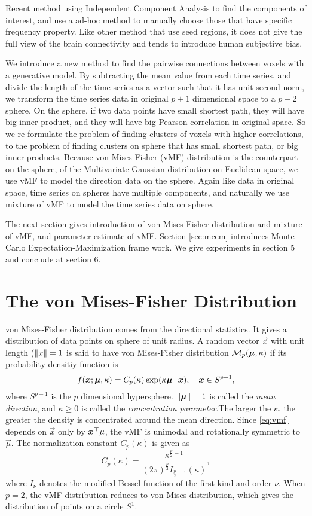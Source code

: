 \documentclass[runningheads,a4paper]{llncs}
\begin{document}
Recent method using Independent Component Analysis to find the
components of interest, and use a ad-hoc method to manually choose
those that have specific frequency property. Like other method that
use seed regions, it does not give the full view of the brain
connectivity and tends to introduce human subjective bias.

We introduce a new method to find the pairwise connections between
voxels with a generative model. By subtracting the mean value from
each time series, and divide the length of the time series as a vector
such that it has unit second norm, we transform the time series data
in original $p+1$ dimensional space to a $p-2$ sphere. On the sphere,
if two data points have small shortest path, they will have big inner
product, and they will have big Pearson correlation in original
space. So we re-formulate the problem of finding clusters of voxels
with higher correlations, to the problem of finding clusters on sphere
that has small shortest path, or big inner products. Because von
Mises-Fisher (vMF) distribution is the counterpart on the sphere, of
the Multivariate Gaussian distribution on Euclidean space, we use vMF
to model the direction data on the sphere. Again like data in original
space, time series on spheres have multiple components, and naturally
we use mixture of vMF to model the time series data on sphere.

The next section gives introduction of von Mises-Fisher distribution
and mixture of vMF, and parameter estimate of vMF. Section
\ref{sec:mcem} introduces Monte Carlo Expectation-Maximization frame
work. We give experiments in section 5 and conclude at section 6.

\section{The von Mises-Fisher Distribution}\label{sec:vmf}
von Mises-Fisher distribution comes from the directional
statistics. It gives a distribution of data points on sphere of unit
radius. A random vector $\vec x$ with unit length ($\lVert x\rVert = 1$ is
said to have von Mises-Fisher distribution $\cM_p(\vec \mu, \kappa)$
if its probability densitiy function is
\begin{equation}
  f(\vec x;\vec \mu, \kappa) = C_p(\kappa) \exp (\kappa \vec \mu\T \vec x),
  \quad \vec x \in S^{p-1}, 
  \label{eq:vmf}
\end{equation}
where $S^{p-1}$ is the $p$ dimensional hypersphere. $\norm{\vec \mu} =
1$ is called the \emph{mean direction}, and $\kappa \geq 0$ is called
the \emph{concentration parameter}.The larger the $\kappa$, the
greater the density is concentrated around the mean direction. Since
\eqref{eq:vmf} depends on $\vec x$ only by $\vec x\T \mu$, the vMF is
unimodal and rotationally symmetric to $\vec \mu$. The normalization
constant $C_p(\kappa)$ is given as
\begin{equation*}
  C_p(\kappa) = \frac{\kappa^{\frac{p}{2} - 1}}{(2\pi)^{\frac{p}{2}} I_{\frac{p}{2}-1}(\kappa)},
\end{equation*}
where $I_\nu$ denotes the modified Bessel function of the first kind
and order $\nu$. When $p = 2$, the vMF distribution reduces to von
Mises distribution, which gives the distribution of points on a circle
$S^1$.
\end{document}
